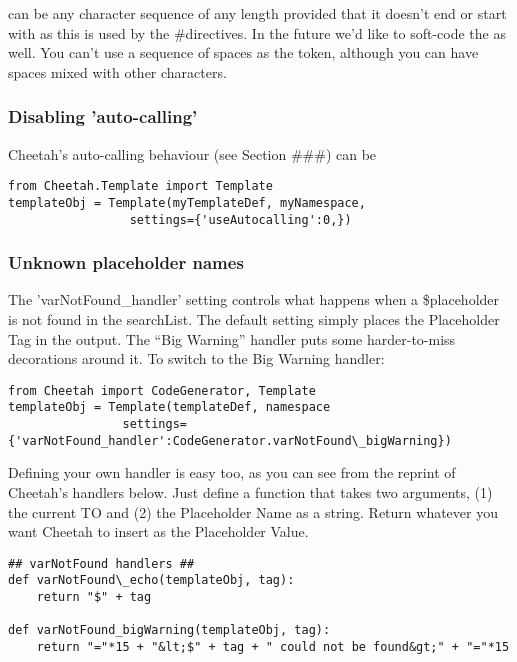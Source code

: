  can be any character sequence of any length
provided that it doesn't end or start with \code{\#} as this is used by the
\#directives.  In the future we'd like to soft-code the
 as well.  You can't use a sequence of spaces as
the token, although you can have spaces mixed with other characters.


\subsubsection{Disabling 'auto-calling'}

Cheetah's auto-calling behaviour (see Section \#\#\#) can be 

\begin{verbatim}
from Cheetah.Template import Template
templateObj = Template(myTemplateDef, myNamespace, 
                 settings={'useAutocalling':0,})
\end{verbatim}


\subsubsection{Unknown placeholder names}

The 'varNotFound\_handler' setting controls what happens when a \$placeholder
is not found in the searchList.  The default setting simply places the
Placeholder Tag in the output.  The ``Big Warning'' handler puts some
harder-to-miss decorations around it.  To switch to the Big Warning handler:

\begin{verbatim}
from Cheetah import CodeGenerator, Template
templateObj = Template(templateDef, namespace
                settings={'varNotFound_handler':CodeGenerator.varNotFound\_bigWarning})
\end{verbatim}

Defining your own handler is easy too, as you can see from the reprint of
Cheetah's handlers below.  Just define a function that takes two arguments, 
(1) the current TO and (2) the Placeholder Name as a string.  Return whatever
you want Cheetah to insert as the Placeholder Value.

\begin{verbatim}
## varNotFound handlers ##
def varNotFound\_echo(templateObj, tag):
    return "$" + tag

def varNotFound_bigWarning(templateObj, tag):
    return "="*15 + "&lt;$" + tag + " could not be found&gt;" + "="*15
    
\end{verbatim}

